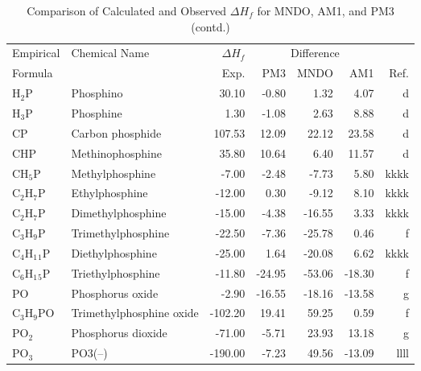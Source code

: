 \begin{table}
\caption{Comparison of Calculated and Observed $\Delta H_f$ 
for MNDO, AM1, and PM3 (contd.)}
\begin{center}
\compresstable
\begin{tabular}{llrrrrr}
Empirical & Chemical Name & $\Delta H_f$ & \multicolumn{3}{c}{Difference} & \\
Formula   &               & Exp. & PM3 &  MNDO  &  AM1 &     Ref.\\
\hline
 H$_2$P         & Phosphino                              &    30.10    &    -0.80  &     1.32  &     4.07  &      d\\
 H$_3$P         & Phosphine                              &     1.30    &    -1.08  &     2.63  &     8.88  &      d\\
 CP          & Carbon phosphide                       &   107.53    &    12.09  &    22.12  &    23.58  &      d\\
 CHP         & Methinophosphine                       &    35.80    &    10.64  &     6.40  &    11.57  &      d\\
 CH$_5$P        & Methylphosphine                        &    -7.00    &    -2.48  &    -7.73  &     5.80  &   kkkk\\
 C$_2$H$_7$P       & Ethylphosphine                         &   -12.00    &     0.30  &    -9.12  &     8.10  &   kkkk\\
 C$_2$H$_7$P       & Dimethylphosphine                      &   -15.00    &    -4.38  &   -16.55  &     3.33  &   kkkk\\
 C$_3$H$_9$P       & Trimethylphosphine                     &   -22.50    &    -7.36  &   -25.78  &     0.46  &      f\\
 C$_4$H$_1$$_1$P      & Diethylphosphine                       &   -25.00    &     1.64  &   -20.08  &     6.62  &   kkkk\\
 C$_6$H$_1$$_5$P      & Triethylphosphine                      &   -11.80    &   -24.95  &   -53.06  &   -18.30  &      f\\
 PO          & Phosphorus oxide                       &    -2.90    &   -16.55  &   -18.16  &   -13.58  &      g\\
 C$_3$H$_9$PO      & Trimethylphosphine oxide               &  -102.20    &    19.41  &    59.25  &     0.59  &      f\\
 PO$_2$         & Phosphorus dioxide                     &   -71.00    &    -5.71  &    23.93  &    13.18  &      g\\
 PO$_3$         & PO3(--)                                 &  -190.00    &    -7.23  &    49.56  &   -13.09  &   llll\\

\end{tabular}
\end{center}
\end{table}
